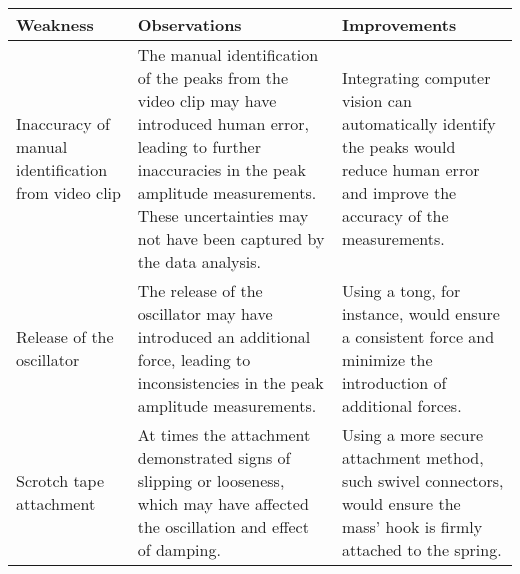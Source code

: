 \documentclass[a4paper,12pt]{article}
\newcommand{\thcolor}{\cellcolor{Blue!25}}
\begin{document}
\begin{center}
  \begin{tabular}{|p{}|p{}|p{}|}
    \hline
    \thcolor Weakness                                   & \thcolor Observations                                                                                                                                                                                                                & \thcolor Improvements                                                                                                                   \\ \hline
    Inaccuracy of manual identification from video clip & The manual identification of the peaks from the video clip may have introduced human error, leading to further inaccuracies in the peak amplitude measurements. These uncertainties may not have been captured by the data analysis. & Integrating computer vision can automatically identify the peaks would reduce human error and improve the accuracy of the measurements. \\ \hline
    Release of the oscillator                           & The release of the oscillator may have introduced an additional force, leading to inconsistencies in the peak amplitude measurements.                                                                                                & Using a tong, for instance, would ensure a consistent force and minimize the introduction of additional forces.                         \\ \hline
    Scrotch tape attachment                             & At times the attachment demonstrated signs of slipping or looseness, which may have affected the oscillation and effect of damping.                                                                                                  & Using a more secure attachment method, such swivel connectors, would ensure the mass' hook is firmly attached to the spring.            \\ \hline
  \end{tabular}
\end{center}

\pagebreak
\end{document}
